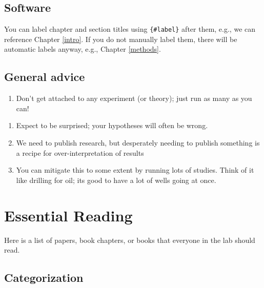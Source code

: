 \documentclass[
]{book}
\providecommand{\tightlist}{%
  \setlength{\itemsep}{0pt}\setlength{\parskip}{0pt}}
\begin{document}
\hypertarget{software}{%
\section{Software}\label{software}}

You can label chapter and section titles using \texttt{\{\#label\}} after them, e.g., we can reference Chapter \ref{intro}. If you do not manually label them, there will be automatic labels anyway, e.g., Chapter \ref{methods}.

\hypertarget{general-advice}{%
\section{General advice}\label{general-advice}}

\begin{enumerate}
\def\labelenumi{\arabic{enumi}.}
\tightlist
\item
  Don't get attached to any experiment (or theory); just run as many as you can!
\end{enumerate}

\begin{enumerate}
\def\labelenumi{\roman{enumi})}
\tightlist
\item
  Expect to be surprised; your hypotheses will often be wrong.
\item
  We need to publish research, but desperately needing to publish something is a recipe
  for over-interpretation of results
\item
  You can mitigate this to some extent by running lots of studies. Think of it like
  drilling for oil; its good to have a lot of wells going at once.
\end{enumerate}

\hypertarget{essential-reading}{%
\chapter{Essential Reading}\label{essential-reading}}

Here is a list of papers, book chapters, or books that everyone in the lab should read.

\hypertarget{categorization}{%
\section{Categorization}\label{categorization}}
\end{document}
